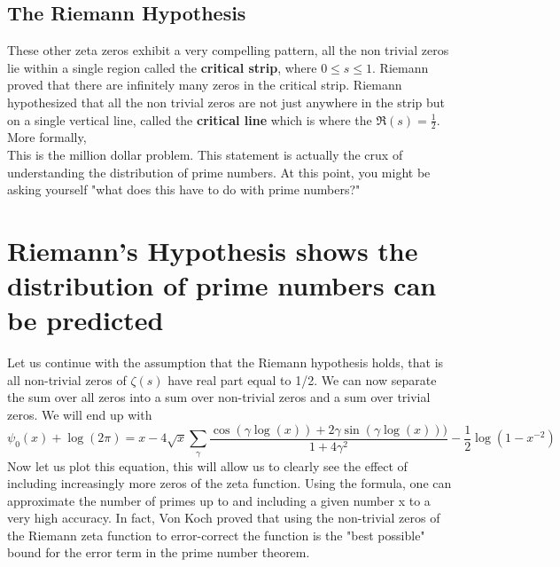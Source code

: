 \documentclass[12pt]{amsart} %
\theoremstyle{definition}
\theoremstyle{remark}
\numberwithin{equation}{section}
\begin{document}
\subsection{The Riemann Hypothesis}  These other zeta zeros exhibit a very compelling pattern, all the non trivial zeros lie within a single region called the \textbf{critical strip}, where $0\le s \le 1 $. Riemann proved that there are infinitely many zeros in the critical strip. Riemann hypothesized that all the non trivial zeros are not just anywhere in the strip but on a single vertical line, called the \textbf{critical line} which is where the $\Re(s) = \frac{1}{2}$. More formally,
\newline
\\
\noindent{}
\newline
This is the million dollar problem. This statement is actually the crux of understanding the distribution of prime numbers.  At this point, you might be asking yourself "what does this have to do with prime numbers?"

\section{Riemann's Hypothesis shows the distribution of prime numbers can be predicted}
Let us continue with the assumption that the Riemann hypothesis holds, that is all non-trivial zeros of $\zeta(s)$ have real part equal to 1/2. We can now separate the sum over all zeros into a sum over non-trivial zeros and a sum over trivial zeros. We will end up with 
$$\psi_0(x) + \log(2\pi) = x- 4\sqrt{x}\sum_\gamma{\frac{\cos(\gamma \log(x))+2\gamma \sin(\gamma \log(x)))}{1+4\gamma^2}} -\frac{1}{2}\log(1-x^{-2})$$
Now let us plot this equation, this will allow us to clearly see the effect of including increasingly more zeros of the zeta function. Using the formula, one can approximate the number of primes up to and including a given number x to a very high accuracy. In fact, Von Koch proved that using the non-trivial zeros of the Riemann zeta function to error-correct the function is the "best possible" bound for the error term in the prime number theorem.
    
\end{document}
